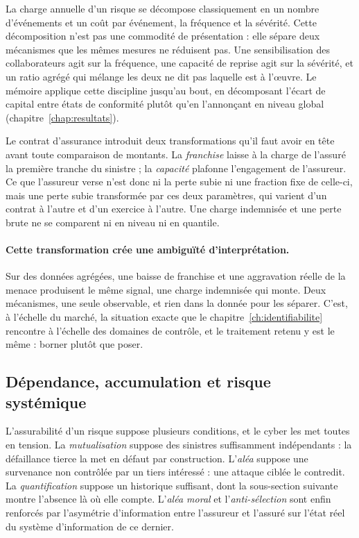 La charge annuelle d'un risque se décompose classiquement en un nombre d'événements et un coût
par événement, la fréquence et la sévérité. Cette décomposition n'est pas une commodité de
présentation : elle sépare deux mécanismes que les mêmes mesures ne réduisent pas. Une
sensibilisation des collaborateurs agit sur la fréquence, une capacité de reprise agit sur la
sévérité, et un ratio agrégé qui mélange les deux ne dit pas laquelle est à l'\oe uvre. Le
mémoire applique cette discipline jusqu'au bout, en décomposant l'écart de capital entre états de
conformité plutôt qu'en l'annonçant en niveau global (chapitre~\ref{chap:resultats}).

Le contrat d'assurance introduit deux transformations qu'il faut avoir en tête avant toute
comparaison de montants. La \emph{franchise} laisse à la charge de l'assuré la première tranche
du sinistre ; la \emph{capacité} plafonne l'engagement de l'assureur. Ce que l'assureur verse
n'est donc ni la perte subie ni une fraction fixe de celle-ci, mais une perte subie transformée
par ces deux paramètres, qui varient d'un contrat à l'autre et d'un exercice à l'autre. Une
charge indemnisée et une perte brute ne se comparent ni en niveau ni en quantile.

\paragraph{Cette transformation crée une ambiguïté d'interprétation.} Sur des données agrégées,
une baisse de franchise et une aggravation réelle de la menace produisent le même signal, une
charge indemnisée qui monte. Deux mécanismes, une seule observable, et rien dans la donnée pour
les séparer. C'est, à l'échelle du marché, la situation exacte que le
chapitre~\ref{ch:identifiabilite} rencontre à l'échelle des domaines de contrôle, et le
traitement retenu y est le même : borner plutôt que poser.

\subsection{Dépendance, accumulation et risque systémique}

L'assurabilité d'un risque suppose plusieurs conditions, et le cyber les met toutes en tension.
La \emph{mutualisation} suppose des sinistres suffisamment indépendants : la défaillance tierce
la met en défaut par construction. L'\emph{aléa} suppose une survenance non contrôlée par un
tiers intéressé : une attaque ciblée le contredit. La \emph{quantification} suppose un
historique suffisant, dont la sous-section suivante montre l'absence là où elle compte.
L'\emph{aléa moral} et l'\emph{anti-sélection} sont enfin renforcés par l'asymétrie
d'information entre l'assureur et l'assuré sur l'état réel du système d'information de ce
dernier.

